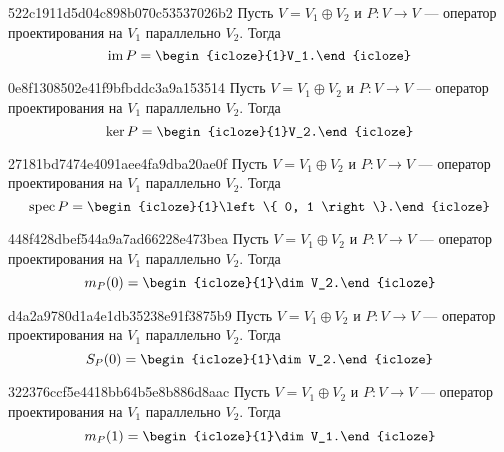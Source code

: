 \begin{note}{522c1911d5d04c898b070c53537026b2}
    Пусть \( V = V_1 \oplus V_2 \) и \( P : V \to V \) --- оператор проектирования на \( V_1 \) параллельно \( V_2 \).
    Тогда
    \[
        \operatorname{im} P = \begin{icloze}{1}V_1.\end{icloze}
    \]
\end{note}

\begin{note}{0e8f1308502e41f9bfbddc3a9a153514}
    Пусть \( V = V_1 \oplus V_2 \) и \( P : V \to V \) --- оператор проектирования на \( V_1 \) параллельно \( V_2 \).
    Тогда
    \[
        \ker P = \begin{icloze}{1}V_2.\end{icloze}
    \]
\end{note}

\begin{note}{27181bd7474e4091aee4fa9dba20ae0f}
    Пусть \( V = V_1 \oplus V_2 \) и \( P : V \to V \) --- оператор проектирования на \( V_1 \) параллельно \( V_2 \).
    Тогда
    \[
        \operatorname{spec} P = \begin{icloze}{1}\left\{ 0, 1 \right\}.\end{icloze}
    \]
\end{note}

\begin{note}{448f428dbef544a9a7ad66228e473bea}
    Пусть \( V = V_1 \oplus V_2 \) и \( P : V \to V \) --- оператор проектирования на \( V_1 \) параллельно \( V_2 \).
    Тогда
    \[
        m_P (0) = \begin{icloze}{1}\dim V_2.\end{icloze}
    \]
\end{note}

\begin{note}{d4a2a9780d1a4e1db35238e91f3875b9}
    Пусть \( V = V_1 \oplus V_2 \) и \( P : V \to V \) --- оператор проектирования на \( V_1 \) параллельно \( V_2 \).
    Тогда
    \[
        S_P (0) = \begin{icloze}{1}\dim V_2.\end{icloze}
    \]
\end{note}

\begin{note}{322376ccf5e4418bb64b5e8b886d8aac}
    Пусть \( V = V_1 \oplus V_2 \) и \( P : V \to V \) --- оператор проектирования на \( V_1 \) параллельно \( V_2 \).
    Тогда
    \[
        m_P (1) = \begin{icloze}{1}\dim V_1.\end{icloze}
    \]
\end{note}

